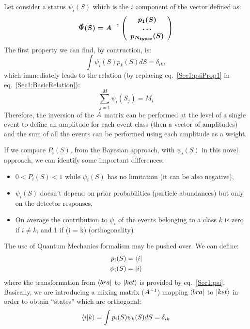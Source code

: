 Let consider a status $\psi_{i}(S)$ which is the $i$ component of the vector
defined as:
\begin{equation}
\label{Sec1:psi}
\vec{\Psi}(S) = \boldmath{A^{-1}} 
\left(
\begin{array}{c}
p_{1}(S)\\
\ldots \\
p_{N_{types}}(S)
\end{array}
\right)
\end{equation}
The first property we can find, by contruction, is:
\begin{equation}
\label{Sec1:psiProp1}
\int \psi_{i}(S) p_{k}(S) dS = \delta_{ik},
\end{equation}
which immediately leads to the relation (by replacing eq.~\ref{Sec1:psiProp1} in eq.~\ref{Sec1:BasicRelation}):
\begin{equation}
\label{Sec1:psi}
\sum\limits_{j=1}^{M}\psi_{i}(S_j) = M_{i}
\end{equation}
Therefore, the inversion of the $\boldmath{A}$ matrix can be performed at the
level of a single event to define an amplitude for each event class (then a
vector of amplitudes) and the sum of all the events can be performed using
each amplitude as a weight.

If we compare $P_{i}(S)$, from the Bayesian approach, with $\psi_{i}(S)$ in
this novel approach, we can identify some important differences:
\begin{itemize}
\item $0 < P_{i}(S) < 1$ while $\psi_{i}(S)$ has no limitation (it can be also
  negative),\\
\item $\psi_{i}(S)$ doesn't depend on prior probabilities (particle
  abundances) but only on the detector responses,\\
\item On average the contribution to
  $\psi_{i}$ of the events belonging to a class $k$ is zero if $i \neq k$, and
  1 if (i = k) (orthogonality)
\end{itemize}

The use of Quantum Mechanics formalism may be pushed over.
We can define:
\begin{eqnarray}
\label{Sec1:QMdef1}
p_{i}(S) = \bra{i} \\
\psi_{i}(S) = \ket{i}
\end{eqnarray}
where the transformation from $\bra{bra}$ to $\ket{ket}$ is provided by eq.~\ref{Sec1:psi}.
Basically, we are introducing a mixing matrix ($\boldmath{A^{-1}}$) mapping $\bra{bra}$
to $\ket{ket}$ in order to obtain ``states'' which are orthogonal:
\begin{equation}
\label{Sec1:Orto}
\braket{i|k} = \int p_{i}(S) \psi_{k}(S) dS = \delta_{ik}
\end{equation}

